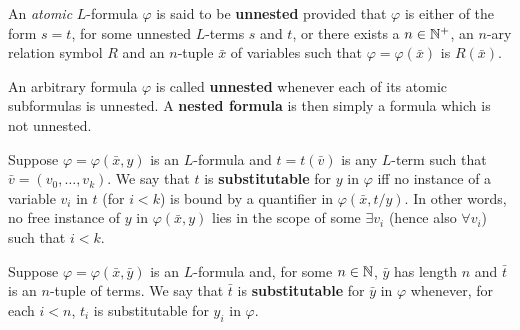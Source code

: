 \begin{dfn}
	An \textit{atomic} $L$-formula $\varphi$ is said to be \textbf{unnested} provided that $\varphi$ is either of the form $s=t$, for some unnested $L$-terms $s$ and $t$, or there exists a $n\in\mathbb{N}^{+}$, an $n$-ary relation symbol $R$ and an $n$-tuple $\bar{x}$ of variables such that $\varphi=\varphi(\bar{x})$ is $R(\bar{x})$.

\end{dfn}

\begin{dfn}
	An arbitrary formula $\varphi$ is called \textbf{unnested} whenever each of its atomic subformulas is unnested.  A \textbf{nested formula} is then simply a formula which is not unnested.
\end{dfn}

\begin{dfn}
	Suppose $\varphi=\varphi(\bar{x},y)$ is an $L$-formula and $t=t(\bar{v})$ is any $L$-term such that $\bar{v}=(v_0,\dotsc,v_k)$.  We say that $t$ is \textbf{substitutable} for $y$ in $\varphi$ iff no instance of a variable $v_i$ in $t$ (for $i<k$) is bound by a quantifier in $\varphi(\bar{x},t/y)$.  In other words, no free instance of $y$ in $\varphi(\bar{x},y)$ lies in the scope of some $\exists v_i$ (hence also $\forall v_i$) such that $i<k$.
\end{dfn}

\begin{dfn}[Substitutability]
	Suppose $\varphi=\varphi(\bar{x},\bar{y})$ is an $L$-formula and, for some $n\in\mathbb{N}$, $\bar{y}$ has length $n$ and $\bar{t}$ is an $n$-tuple of terms.  We say that $\bar{t}$ is \textbf{substitutable} for $\bar{y}$ in $\varphi$ whenever, for each $i<n$, $t_i$ is substitutable for $y_i$ in $\varphi$.
\end{dfn}

